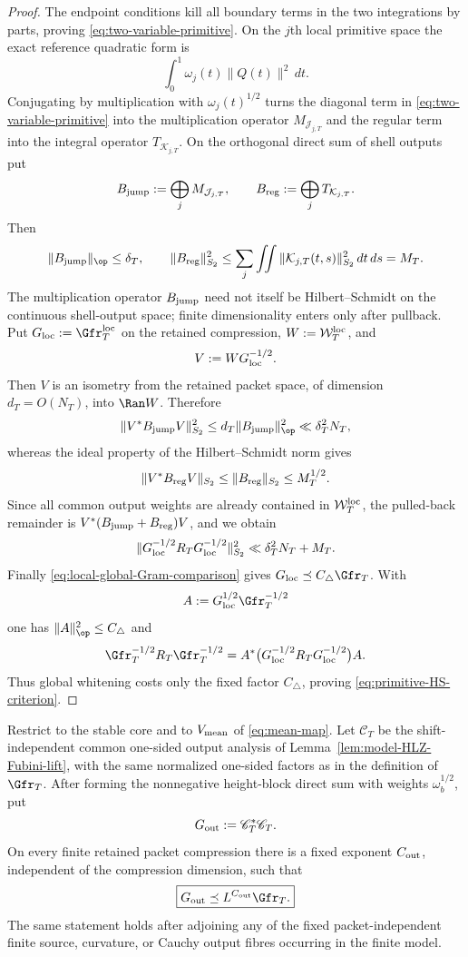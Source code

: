 \begin{proof}
The endpoint conditions kill all boundary terms in the two integrations by
parts, proving \eqref{eq:two-variable-primitive}. On the $j$th local primitive
space the exact reference quadratic form is
\[
\int_0^1\omega_j(t)\|Q(t)\|^2\,dt.
\]
Conjugating by multiplication with $\omega_j(t)^{1/2}$ turns the diagonal term
in \eqref{eq:two-variable-primitive} into the multiplication operator
$M_{\mathcal J_{j,T}}$ and the regular term into the integral operator
$T_{\mathcal K_{j,T}}$. On the orthogonal direct sum of shell outputs put
\[
B_{\rm jump}:=\bigoplus_jM_{\mathcal J_{j,T}},
\qquad
B_{\rm reg}:=\bigoplus_jT_{\mathcal K_{j,T}}.
\]
Then
\[
\|B_{\rm jump}\|_{\op}\le\delta_T,
\qquad
\|B_{\rm reg}\|_{S_2}^2
\le\sum_j\iint\|\mathcal K_{j,T}(t,s)\|_{S_2}^2\,dt\,ds=M_T.
\]
The multiplication operator $B_{\rm jump}$ need not itself be
Hilbert--Schmidt on the continuous shell-output space; finite dimensionality
enters only after pullback. Put $G_{\rm loc}:=\Gfr_T^{\rm loc}$ on the retained
compression, $W:=\mathcal W_T^{\rm loc}$, and
\[
V:=WG_{\rm loc}^{-1/2}.
\]
Then $V$ is an isometry from the retained packet space, of dimension
$d_T=O(N_T)$, into $\Ran W$. Therefore
\[
\|V^*B_{\rm jump}V\|_{S_2}^2
\le d_T\|B_{\rm jump}\|_{\op}^2
\ll\delta_T^2N_T,
\]
whereas the ideal property of the Hilbert--Schmidt norm gives
\[
\|V^*B_{\rm reg}V\|_{S_2}
\le\|B_{\rm reg}\|_{S_2}\le M_T^{1/2}.
\]
Since all common output weights are already contained in
$\mathcal W_T^{\rm loc}$, the pulled-back remainder is
$V^*(B_{\rm jump}+B_{\rm reg})V$, and we obtain
\[
\|G_{\rm loc}^{-1/2}R_TG_{\rm loc}^{-1/2}\|_{S_2}^2
\ll\delta_T^2N_T+M_T.
\]
Finally \eqref{eq:local-global-Gram-comparison} gives
$G_{\rm loc}\preceq C_\triangle\Gfr_T$. With
\[
A:=G_{\rm loc}^{1/2}\Gfr_T^{-1/2}
\]
one has $\|A\|_{\op}^2\le C_\triangle$ and
\[
\Gfr_T^{-1/2}R_T\Gfr_T^{-1/2}
=A^*\bigl(G_{\rm loc}^{-1/2}R_TG_{\rm loc}^{-1/2}\bigr)A.
\]
Thus global whitening costs only the fixed factor $C_\triangle$, proving
\eqref{eq:primitive-HS-criterion}.
\end{proof}

\begin{lemma}
\label{lem:HLZ-output-reference-compatibility}
Restrict to the stable core and to $V_{\rm mean}$ of
\eqref{eq:mean-map}.  Let $\mathscr C_T$ be the shift-independent common
one-sided output analysis of Lemma~\ref{lem:model-HLZ-Fubini-lift}, with the
same normalized one-sided factors as in the definition of $\Gfr_T$.  After
forming the nonnegative height-block direct sum with weights
$\omega_b^{1/2}$, put
\[
G_{\rm out}:=\mathscr C_T^*\mathscr C_T.
\]
On every finite retained packet compression there is a fixed exponent
$C_{\rm out}$, independent of the compression dimension, such that
\begin{equation}
\boxed{
G_{\rm out}\preceq L^{C_{\rm out}}\Gfr_T.
}
\label{eq:HLZ-output-reference-comparison}
\end{equation}
The same statement holds after adjoining any of the fixed packet-independent
finite source, curvature, or Cauchy output fibres occurring in the finite model.
\end{lemma}

